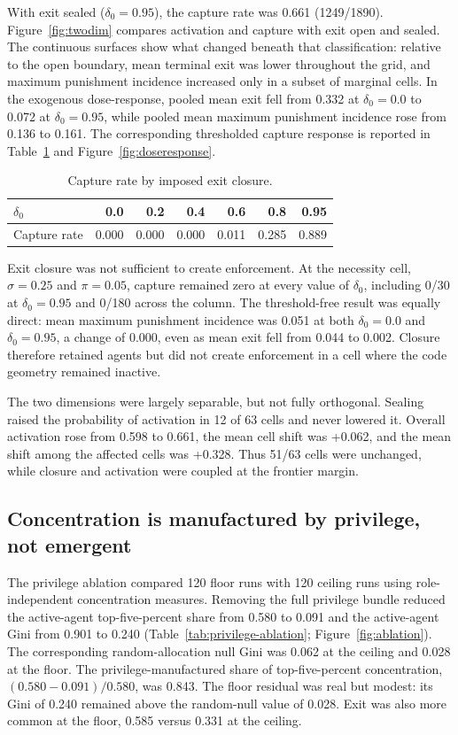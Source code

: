 \documentclass[12pt]{article}
\begin{document}
With exit sealed ($\delta_0=0.95$), the capture rate was 0.661 (1249/1890). Figure~\ref{fig:twodim} compares activation and capture with exit open and sealed. The continuous surfaces show what changed beneath that classification: relative to the open boundary, mean terminal exit was lower throughout the grid, and maximum punishment incidence increased only in a subset of marginal cells. In the exogenous dose-response, pooled mean exit fell from 0.332 at $\delta_0=0.0$ to 0.072 at $\delta_0=0.95$, while pooled mean maximum punishment incidence rose from 0.136 to 0.161. The corresponding thresholded capture response is reported in Table~\ref{tab:dose-response} and Figure~\ref{fig:doseresponse}.

\begin{table}[htbp]
\centering
\caption{Capture rate by imposed exit closure.}
\label{tab:dose-response}
\begin{tabular}{lrrrrrr}
\hline
$\delta_0$ & 0.0 & 0.2 & 0.4 & 0.6 & 0.8 & 0.95 \\
\hline
Capture rate & 0.000 & 0.000 & 0.000 & 0.011 & 0.285 & 0.889 \\
\hline
\end{tabular}
\end{table}

Exit closure was not sufficient to create enforcement. At the necessity cell, $\sigma=0.25$ and $\pi=0.05$, capture remained zero at every value of $\delta_0$, including 0/30 at $\delta_0=0.95$ and 0/180 across the column. The threshold-free result was equally direct: mean maximum punishment incidence was 0.051 at both $\delta_0=0.0$ and $\delta_0=0.95$, a change of 0.000, even as mean exit fell from 0.044 to 0.002. Closure therefore retained agents but did not create enforcement in a cell where the code geometry remained inactive.

The two dimensions were largely separable, but not fully orthogonal. Sealing raised the probability of activation in 12 of 63 cells and never lowered it. Overall activation rose from 0.598 to 0.661, the mean cell shift was +0.062, and the mean shift among the affected cells was +0.328. Thus 51/63 cells were unchanged, while closure and activation were coupled at the frontier margin.

\subsection{Concentration is manufactured by privilege, not emergent}

The privilege ablation compared 120 floor runs with 120 ceiling runs using role-independent concentration measures. Removing the full privilege bundle reduced the active-agent top-five-percent share from 0.580 to 0.091 and the active-agent Gini from 0.901 to 0.240 (Table~\ref{tab:privilege-ablation}; Figure~\ref{fig:ablation}). The corresponding random-allocation null Gini was 0.062 at the ceiling and 0.028 at the floor. The privilege-manufactured share of top-five-percent concentration, $(0.580-0.091)/0.580$, was 0.843. The floor residual was real but modest: its Gini of 0.240 remained above the random-null value of 0.028. Exit was also more common at the floor, 0.585 versus 0.331 at the ceiling.
\end{document}
